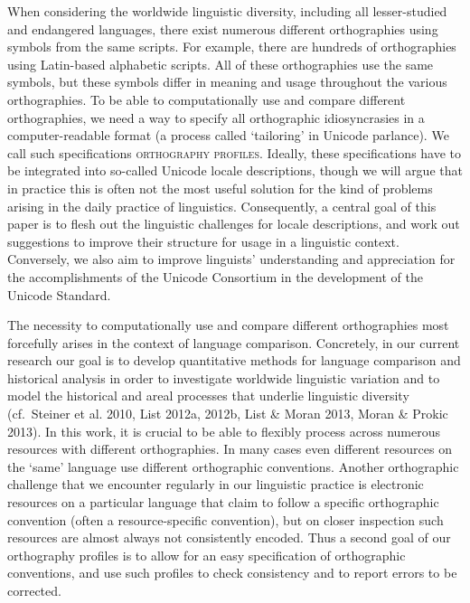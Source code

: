 When considering the worldwide linguistic diversity, including all lesser-studied and endangered languages, there exist numerous different orthographies using symbols from the same scripts. For example, there are hundreds of orthographies using Latin-based alphabetic scripts. All of these orthographies use the same symbols, but these symbols differ in meaning and usage throughout the various orthographies. To be able to computationally use and compare different orthographies, we need a way to specify all orthographic idiosyncrasies in a computer-readable format (a process called `tailoring' in Unicode parlance). We call such specifications \textsc{orthography profiles}. Ideally, these specifications have to be integrated into so-called Unicode locale descriptions, though we will argue that in practice this is often not the most useful solution for the kind of problems arising in the daily practice of linguistics. Consequently, a central goal of this paper is to flesh out the linguistic challenges for locale descriptions, and work out suggestions to improve their structure for usage in a linguistic context. Conversely, we also aim to improve linguists' understanding and appreciation for the accomplishments of the Unicode Consortium in the development of the Unicode Standard.

The necessity to computationally use and compare different orthographies most forcefully arises in the context of language comparison. Concretely, in our current research our goal is to develop quantitative methods for language comparison and historical analysis in order to investigate worldwide linguistic variation and to model the historical and areal processes that underlie linguistic diversity (cf.~Steiner et al. 2010, List 2012a, 2012b, List \& Moran 2013, Moran \& Prokic 2013). In this work, it is crucial to be able to flexibly process across numerous resources with different orthographies. In many cases even different resources on the `same' language use different orthographic conventions. Another orthographic challenge that we encounter regularly in our linguistic practice is electronic resources on a particular language that claim to follow a specific orthographic convention (often a resource-specific convention), but on closer inspection such resources are almost always not consistently encoded. Thus a second goal of our orthography profiles is to allow for an easy specification of orthographic conventions, and use such profiles to check consistency and to report errors to be corrected.

